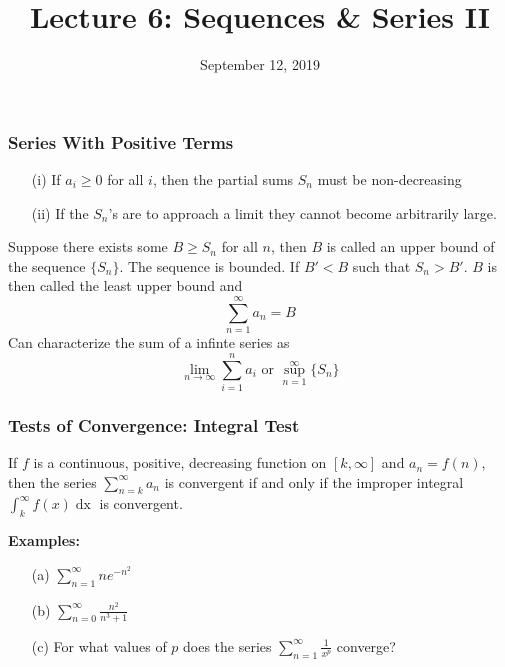 \documentclass{beamer}
\title{Lecture 6: Sequences \& Series II}
\date{September 12, 2019}
\begin{document}
	
\frame{\titlepage}

\begin{frame}
\frametitle{Series With Positive Terms}
\begin{itemize}
	\item[(i)] If $a_i \geq 0$ for all $i$, then the partial sums $S_n$ must be non-decreasing
	\item[(ii)] If the $S_n$'s are to approach a limit they cannot become arbitrarily large.
\end{itemize}
Suppose there exists some $B \geq S_n$ for all $n$, then $B$ is called an upper bound of the sequence $\{S_n\}$. The sequence is bounded. If $B' < B$ such that $S_n > B'$. $B$ is then called the least upper bound and 
$$\sum_{n=1}^\infty a_n = B$$
Can characterize the sum of a infinte series as
$$\lim\limits_{n \to \infty} \sum_{i=1}^n a_i \mbox{ or } \sup_{n=1}^\infty \{S_n\}$$

\end{frame}

\begin{frame}
\frametitle{Tests of Convergence: Integral Test}
If $f$ is a continuous, positive, decreasing function on $[k,\infty]$ and $a_n = f(n)$, then the series $\sum_{n=k}^\infty a_n$ is convergent if and only if the improper integral $\int_k^\infty f(x)\mathop{dx}$ is convergent.

\vspace{12pt}
\textbf{Examples:}
\begin{itemize}
	\item[(a)] $\sum_{n=1}^\infty n e^{-n^2}$
	\item[(b)] $\sum_{n=0}^\infty \frac{n^2}{n^3+1}$
	\item[(c)] For what values of $p$ does the series $\sum_{n=1}^\infty \frac{1}{x^p}$ converge?
\end{itemize}
\end{frame}
\end{document}

